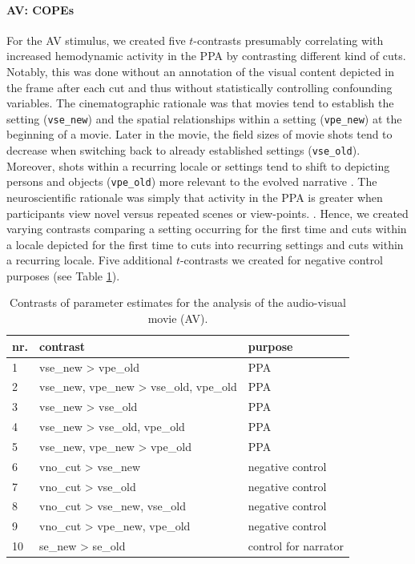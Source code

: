 \documentclass[english]{article}
\begin{document}
\paragraph{AV: COPEs}

For the AV stimulus, we created five $t$-contrasts presumably correlating with
increased hemodynamic activity in the PPA by contrasting different kind of cuts.
Notably, this was done without an annotation of the visual content depicted in
the frame after each cut and thus without statistically controlling confounding
variables.
The cinematographic rationale was that movies tend to establish the setting
(\texttt{vse\_new}) and the spatial relationships within a setting
(\texttt{vpe\_new}) at the beginning of a movie.
Later in the movie, the field sizes of movie shots tend to decrease when
switching back to already established settings (\texttt{vse\_old}).
Moreover, shots within a recurring locale or settings tend to shift to depicting
persons and objects (\texttt{vpe\_old}) more relevant to the evolved narrative
\citep{brown2012cinematography, mercado2011filmmakers}.
The neuroscientific rationale was simply that activity in the PPA is
greater when participants view novel versus repeated scenes or view-points.
\citep{epstein1999parahippocampal}.
Hence, we created varying contrasts comparing a setting occurring for the first
time and cuts within a locale depicted for the first time to cuts into recurring
settings and cuts within a recurring locale.
Five additional $t$-contrasts we created for negative control purposes (see
Table \ref{tab:av-contrasts}).

\begin{table}[t]
    \caption{Contrasts of parameter estimates for the analysis of the audio-visual movie (AV).}
\label{tab:av-contrasts}
\footnotesize
\begin{tabular}{lll}
\toprule
\textbf{nr.} &  \textbf{contrast} & \textbf{purpose} \\
\midrule
1 & vse\_new > vpe\_old & PPA \tabularnewline
2 & vse\_new, vpe\_new > vse\_old, vpe\_old & PPA \tabularnewline
3 & vse\_new > vse\_old & PPA \tabularnewline
4 & vse\_new > vse\_old, vpe\_old & PPA \tabularnewline
5 & vse\_new, vpe\_new > vpe\_old & PPA \tabularnewline
6 & vno\_cut > vse\_new & negative control \tabularnewline
7 & vno\_cut > vse\_old & negative control \tabularnewline
8 & vno\_cut > vse\_new, vse\_old & negative control \tabularnewline
9 & vno\_cut > vpe\_new, vpe\_old & negative control \tabularnewline
10 & se\_new > se\_old & control for narrator \tabularnewline
\end{tabular}
\end{table}
\end{document}
